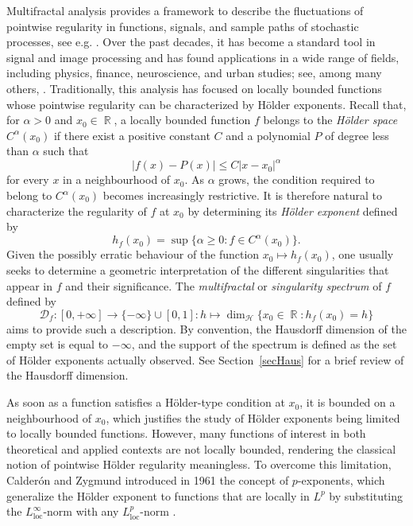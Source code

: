 \documentclass[a4paper,11pt,oneside]{article}
\DeclareMathOperator{\R}{\mathbb{R}}
\newcommand{\ccint}[1]{\left[{#1}\right]}
\newcommand{\modu}[1]{\left\vert{#1}\right\vert}
\theoremstyle{definition}
\theoremstyle{plain}
\begin{document}
Multifractal analysis provides a framework to describe the fluctuations of pointwise regularity in functions, signals, and sample paths of stochastic processes, see e.g. \cite{ArneodoBacryMuzy1998,Balanca2014,BarralFournierJaffardSeuret2010,BarralSeuret2007,jaffard04,Jaffard1996,Jaffard1997,JaffardMartin2017}. Over the past decades, it has become a standard tool in signal and image processing and has found applications in a wide range of fields, including physics, finance, neuroscience, and urban studies; see, among many others, \cite{MandMemor,AbryWendtJaffard2012,Arneodo:02,Arneodo1999,Gerasimova2013,LAROCCA:2018:A,Lashermes2005,Lavallee1993,Lengyel2022,pexp2,Mandelbrot1974,Parisi:85,WenAbrJaf07,LevyVehel1994}. Traditionally, this analysis has focused on locally bounded functions whose pointwise regularity can be characterized by H\"older exponents. Recall that, for $\alpha>0$ and $x_0 \in \R$, a locally bounded function $f$ belongs to the \textit{H\"older space} $C^\alpha(x_0)$ if there exist a positive constant $C$ and a polynomial $P$ of degree less than $\alpha$ such that
\[
\modu{f(x)-P(x)}\leq C\modu{x-x_0}^\alpha
\]
for every $x$ in a neighbourhood of $x_0$. As $\alpha$ grows, the condition required to belong to $C^\alpha(x_0)$ becomes increasingly restrictive. It is therefore natural to characterize the regularity of $f$ at $x_0$ by determining its \textit{H\"older exponent} defined by
\[
h_f(x_0)=\sup\{\alpha\geq0:f\in C^\alpha(x_0)\}.
\]
Given the possibly erratic behaviour of the function $x_0\mapsto h_f(x_0)$, one usually seeks to determine a geometric interpretation of the different singularities that appear in $f$ and  their significance. The \emph{multifractal} or \textit{singularity spectrum} of $f$ defined by 
\[
\mathscr{D}_f:\ccint{0,+\infty}\rightarrow\{-\infty\}\cup\ccint{0,1}:h\mapsto\dim_{\mathcal{H}}\big\{x_0\in\R:h_f(x_0)=h\big\}
\]
aims to provide such a description. By convention, the Hausdorff dimension of the empty set is equal to $-\infty$, and the support of the spectrum is defined as the set of H\"older exponents actually observed. See Section~\ref{secHaus} for a brief review of the Hausdorff dimension.

As soon as a function satisfies a H\"older-type condition at $x_0$, it is bounded on a neighbourhood of $x_0$, which justifies the study of H\"older exponents being limited to locally bounded functions. However, many functions of interest in both theoretical and applied contexts are not locally bounded, rendering the classical notion of pointwise H\"older regularity meaningless. To overcome this limitation, Calderón and Zygmund introduced in 1961 the concept of $p$-exponents, which generalize the H\"older exponent to functions that are locally in $L^p$ by substituting the $L^\infty_{\text{loc}}$-norm with any $L^p_{\text{loc}}$-norm \cite{cald}.
\end{document}
